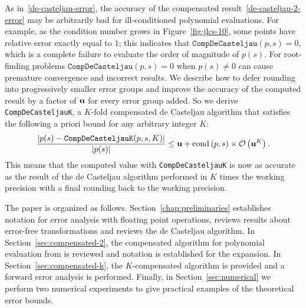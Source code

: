 As in~\eqref{de-casteljau-error}, the accuracy of the compensated
result~\eqref{de-casteljau-2-error} may be arbitrarily bad for ill-conditioned
polynomial evaluations. For example, as the condition number grows in
Figure~\ref{fig:jlcs-10}, some points have relative error exactly equal to
\(1\); this indicates that \(\mathtt{CompDeCasteljau}(p, s) = 0\), which is
a complete failure to evaluate the order of magnitude of \(p(s)\). For
root-finding problems \(\mathtt{CompDeCasteljau}(p, s) = 0\) when
\(p(s) \neq 0\) can cause premature convergence and incorrect results.
We describe how to defer rounding into progressively
smaller error groups and improve the accuracy of the computed result by a
factor of \(\mathbf{u}\) for every error group added. So we derive
\texttt{CompDeCasteljauK}, a \(K\)-fold compensated de Casteljau algorithm
that satisfies the following a priori bound for any arbitrary integer \(K\):
\begin{equation}
  \frac{\left|p(s) - \mathtt{CompDeCasteljauK}(p, s, K)\right|}{
    \left|p(s)\right|} \leq \mathbf{u} + \operatorname{cond}\left(p, s\right) \times
    \mathcal{O}\left(\mathbf{u}^K\right).
\end{equation}
This means that the computed value with \texttt{CompDeCasteljauK} is now
as accurate as the result of the de Casteljau algorithm performed in
\(K\) times the working precision with a final rounding back to the
working precision.

The paper is organized as follows. Section~\ref{chap:preliminaries} establishes
notation for error analysis with floating point operations, reviews
results about error-free transformations and reviews the
de Casteljau algorithm. In Section~\ref{sec:compensated-2},
the compensated algorithm for polynomial evaluation from \cite{Jiang2010} is
reviewed and notation is established for the expansion. In
Section~\ref{sec:compensated-k}, the \(K\)-compensated algorithm is provided
and a forward error analysis is performed. Finally, in
Section~\ref{sec:numerical} we perform two numerical experiments to
give practical examples of the theoretical error bounds.
